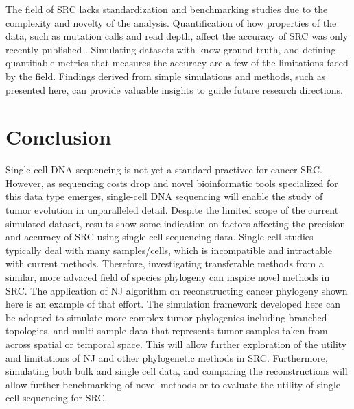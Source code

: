 \documentclass{article}
\begin{document}
The field of SRC lacks standardization and benchmarking studies due to the complexity and novelty of the analysis. Quantification of how properties of the data, such as mutation calls and read depth, affect the accuracy of SRC was only recently published \cite{Liu2020,Tarabichi2021}. Simulating datasets with know ground truth, and defining quantifiable metrics that measures the accuracy are a few of the limitations faced by the field. Findings derived from simple simulations and methods, such as presented here, can provide valuable insights to guide future research directions.

\section{Conclusion}
Single cell DNA sequencing is not yet a standard practivce for cancer SRC. However, as sequencing costs drop and novel bioinformatic tools specialized for this data type emerges, single-cell DNA sequencing will enable the study of tumor evolution in unparalleled detail. Despite the limited scope of the current simulated dataset, results show some indication on factors affecting the precision and accuracy of SRC using single cell sequencing data. Single cell studies typically deal with many samples/cells, which is incompatible and intractable with current methods. Therefore, investigating transferable methods from a similar, more advaced field of species phylogeny can inspire novel methods in SRC. The application of NJ algorithm on reconstructing cancer phylogeny shown here is an example of that effort. The simulation framework developed here can be adapted to simulate more complex tumor phylogenies including branched topologies, and multi sample data that represents tumor samples taken from across spatial or temporal space. This will allow further exploration of the utility and limitations of NJ and other phylogenetic methods in SRC. Furthermore, simulating both bulk and single cell data, and comparing the reconstructions will allow further benchmarking of novel methods or to evaluate the utility of single cell sequencing for SRC.


\pagebreak


 
\end{document}
